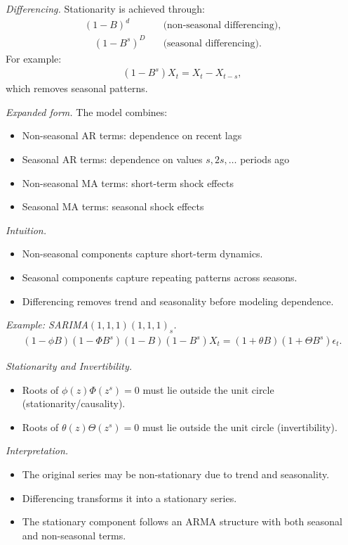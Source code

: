 \documentclass[10pt,a4paper]{article}
\begin{document}
	\textit{Differencing.} Stationarity is achieved through:
	\begin{align*}
	(1 - B)^d &\quad \text{(non-seasonal differencing)},\\
	\quad (1 - B^s)^D &\quad \text{(seasonal differencing)}.
	\end{align*}
	For example:
	\begin{align*}
	(1 - B^s)X_t = X_t - X_{t-s},
	\end{align*}
	which removes seasonal patterns.
	
	\textit{Expanded form.} The model combines:
	\begin{itemize}
	\item Non-seasonal AR terms: dependence on recent lags
	\item Seasonal AR terms: dependence on values $s, 2s, \dots$ periods ago
	\item Non-seasonal MA terms: short-term shock effects
	\item Seasonal MA terms: seasonal shock effects
	\end{itemize}
	
	\textit{Intuition.}
	\begin{itemize}
	\item Non-seasonal components capture short-term dynamics.
	\item Seasonal components capture repeating patterns across seasons.
	\item Differencing removes trend and seasonality before modeling dependence.
	\end{itemize}
	
	\textit{Example: SARIMA$(1,1,1)(1,1,1)_s$.}
	\begin{align*}
	(1 - \phi B)(1 - \Phi B^s)(1 - B)(1 - B^s)X_t = (1 + \theta B)(1 + \Theta B^s)\epsilon_t.
	\end{align*}
	
	\textit{Stationarity and Invertibility.}
	\begin{itemize}
	\item Roots of $\phi(z)\Phi(z^s)=0$ must lie outside the unit circle (stationarity/causality).
	\item Roots of $\theta(z)\Theta(z^s)=0$ must lie outside the unit circle (invertibility).
	\end{itemize}
	
	\textit{Interpretation.}
	\begin{itemize}
	\item The original series may be non-stationary due to trend and seasonality.
	\item Differencing transforms it into a stationary series.
	\item The stationary component follows an ARMA structure with both seasonal and non-seasonal terms.
	\end{itemize}
	
\end{document}
